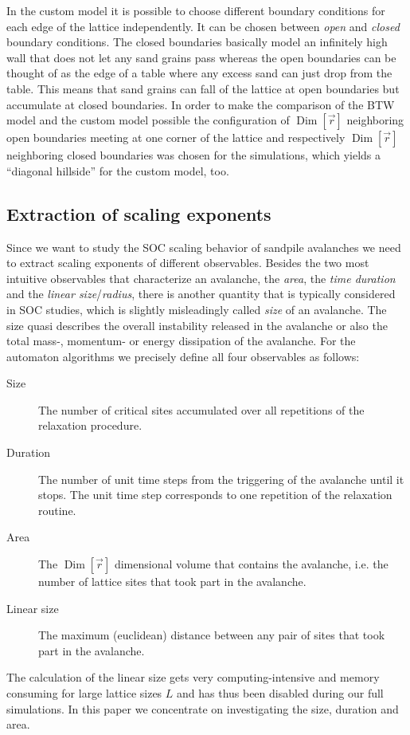 In the custom model it is possible to choose different boundary conditions for each edge of the lattice independently.
It can be chosen between \emph{open} and \emph{closed} boundary conditions. The closed boundaries basically model an
infinitely high wall that does not let any sand grains pass whereas the open boundaries can be thought of as the edge
of a table where any excess sand can just drop from the table. This means that sand grains can fall of the lattice at
open boundaries but accumulate at closed boundaries.
In order to make the comparison of the BTW model and the custom model possible the configuration of
$\operatorname{Dim}\left[\vec{r}\right]$ neighboring open boundaries meeting at one corner of the lattice and
respectively $\operatorname{Dim}\left[\vec{r}\right]$ neighboring closed boundaries was chosen for the simulations,
which yields a \enquote{diagonal hillside} for the custom model, too.

\subsection{Extraction of scaling exponents}
\label{sec:extractCritExp}
Since we want to study the SOC scaling behavior of sandpile avalanches we need to extract scaling exponents of
different observables. Besides the two most intuitive observables that characterize an avalanche, the \emph{area},
the \emph{time duration} and the \emph{linear size}/\emph{radius}, there is another quantity that is typically considered
in SOC studies, which is slightly misleadingly called \emph{size} of an avalanche. The size quasi describes the overall
instability released in the avalanche or also the total mass-, momentum- or energy dissipation of the avalanche.
For the automaton algorithms we precisely define all four observables as follows:
\begin{description}
\item[Size] The number of critical sites accumulated over all repetitions of the relaxation procedure.
\item[Duration] The number of unit time steps from the triggering of the avalanche until it stops. The unit time step
                corresponds to one repetition of the relaxation routine.
\item[Area] The $\operatorname{Dim}\left[\vec{r}\right]$ dimensional volume that contains the avalanche,
            i.e. the number of lattice sites that took part in the avalanche.
\item[Linear size] The maximum (euclidean) distance between any pair of sites that took part in the avalanche.
\end{description}
The calculation of the linear size gets very computing-intensive and memory consuming for large
lattice sizes $L$ and has thus been disabled during our full simulations. In this paper we concentrate
on investigating the size, duration and area.

